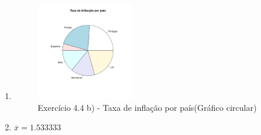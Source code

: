 \documentclass[11pt,a4paper]{report}
\begin{document}
\begin{enumerate}[label=\arabic{chapter}.\arabic*]
\begin{enumerate}[label=\alph*)]
			
		\clearpage
		\item \hfill
			\begin{figure}[h!]
				\centering
				\includegraphics[width=0.4\textwidth]{recursos/ex4_4b.png}
				\caption{Exercício 4.4 b) - Taxa de inflação por país(Gráfico
				circular)}
			\end{figure}
			
		\item $\overline{x} = 1.533333$\hfill
			
		\end{enumerate}
\end{enumerate}

\clearpage
\begingroup
\let\clearpage\relax
\printbibliography[heading=bibintoc,title={Bibliografia}]
\listoftables{}
\listoffigures{}
\endgroup
\end{document}
